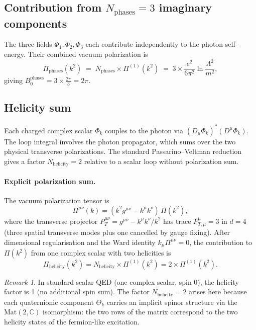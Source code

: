\documentclass[12pt,a4paper]{article}
\theoremstyle{definition}
\theoremstyle{remark}
\newtheorem{remark}[theorem]{Remark}
\newcommand{\C}{\mathbb{C}}
\begin{document}
\subsection{Contribution from $N_\mathrm{phases} = 3$ imaginary components}

The three fields $\Phi_1, \Phi_2, \Phi_3$ each contribute independently to the
photon self-energy.  Their combined vacuum polarization is
\begin{equation}
  \Pi_\mathrm{phases}(k^2)
  \;=\; N_\mathrm{phases} \times \Pi^{(1)}(k^2)
  \;=\; 3 \times \frac{e^2}{6\pi^2}\ln\frac{\Lambda^2}{m^2},
  \label{eq:Pi_phases}
\end{equation}
giving $B_0^{\text{phases}} = 3 \times \frac{2\pi}{3} = 2\pi$.

\subsection{Helicity sum}

Each charged complex scalar $\Phi_k$ couples to the photon via
$(D_\mu\Phi_k)^*(D^\mu\Phi_k)$.  The loop integral involves the photon
propagator, which sums over the two physical transverse polarizations.
The standard Passarino--Veltman reduction gives a factor $N_\mathrm{helicity} = 2$
relative to a scalar loop without polarization sum.

\paragraph{Explicit polarization sum.}
The vacuum polarization tensor is
\begin{equation}
  \Pi^{\mu\nu}(k) = (k^2 g^{\mu\nu} - k^\mu k^\nu)\,\Pi(k^2),
  \label{eq:Pi_tensor}
\end{equation}
where the transverse projector $P^{\mu\nu}_T = g^{\mu\nu} - k^\mu k^\nu/k^2$
has trace $P^\mu_{T,\mu} = 3$ in $d=4$ (three spatial transverse modes plus
one cancelled by gauge fixing).  After dimensional regularisation and the
Ward identity $k_\mu \Pi^{\mu\nu} = 0$, the contribution to $\Pi(k^2)$ from
one complex scalar with two helicities is
\begin{equation}
  \Pi_\mathrm{helicity}(k^2)
  = N_\mathrm{helicity} \times \Pi^{(1)}(k^2)
  = 2 \times \Pi^{(1)}(k^2).
  \label{eq:Pi_helicity}
\end{equation}

\begin{remark}
In standard scalar QED (one complex scalar, spin 0), the helicity factor is
1 (no additional spin sum).  The factor $N_\mathrm{helicity} = 2$ arises here
because each quaternionic component $\Theta_k$ carries an implicit spinor
structure via the $\mathrm{Mat}(2,\C)$ isomorphism: the two rows of the matrix
correspond to the two helicity states of the fermion-like excitation.
\end{remark}
\end{document}
